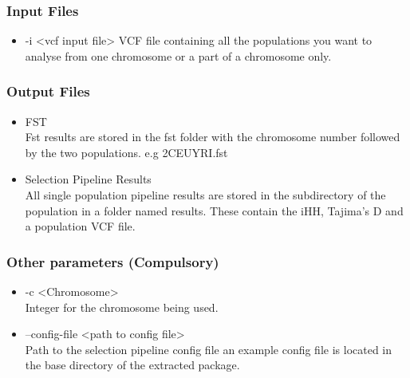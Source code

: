 \documentclass[a4paper,10pt]{article}
\begin{document}
                             \subsubsection{Input Files}
                             \begin{itemize}
                             \item -i <vcf input file>
                             VCF file containing all the populations you want to analyse from one chromosome or a part of a chromosome only. 
                             \end{itemize}
                             \subsubsection{Output Files}
                             \begin{itemize}
                             \item FST \\
                             Fst results are stored in the fst folder with the chromosome number followed by the two populations. e.g 2CEUYRI.fst
                             \item Selection Pipeline Results\\
                             All single population pipeline results are stored in the subdirectory of the population in a folder named results. These contain the iHH, Tajima's D and a population VCF file.
                             \end{itemize}
                             \subsubsection{Other parameters (Compulsory)}
                             \begin{itemize}
                             \item -c <Chromosome>\\
                             Integer for the chromosome being used.
                             \item --config-file <path to config file>\\
                             Path to the selection pipeline config file an example config file is located in the base directory of the extracted package.
                             \end{itemize}
\end{document}
